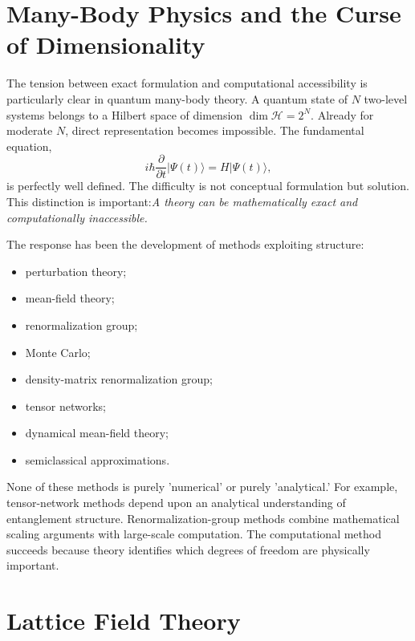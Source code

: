 \section{ Many-Body Physics and the Curse of Dimensionality}
\label{nm:mb}

The tension between exact formulation and computational accessibility is
particularly clear in quantum many-body theory.
A quantum state of $N$ two-level systems belongs to a Hilbert space of dimension
$\dim\mathcal{H}=2^N$.
Already for moderate $N$, direct representation becomes impossible.
The fundamental equation,
\[i\hbar\frac{\partial}{\partial t}|\Psi(t)\rangle=H|\Psi(t)\rangle,\]
is perfectly well defined.
The difficulty is not conceptual formulation but solution.
This distinction is important:\emph{A theory can be mathematically exact 
and computationally inaccessible.}

The response has been the development of methods exploiting structure:
\begin{itemize}
\item perturbation theory;
\item mean-field theory;
\item renormalization group;
\item Monte Carlo;
\item density-matrix renormalization group;
\item tensor networks;
\item dynamical mean-field theory;
\item semiclassical approximations.
\end{itemize}
None of these methods is purely 'numerical' or purely 'analytical.'
For example, tensor-network methods depend upon an analytical understanding of
entanglement structure. Renormalization-group methods combine mathematical
scaling arguments with large-scale computation.
The computational method succeeds because theory identifies which degrees of
freedom are physically important.

\section{ Lattice Field Theory}
\label{nm:lft}


